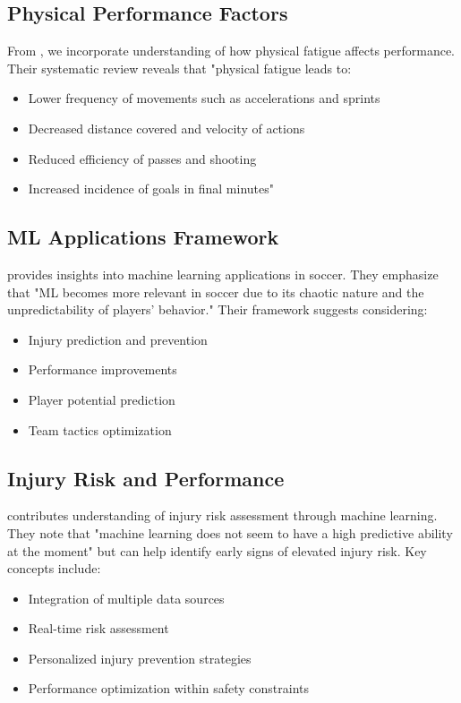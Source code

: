 \documentclass[10pt,journal,compsoc]{IEEEtran}
\begin{document}
\subsection{Physical Performance Factors}
From \cite{dambroz2022effect}, we incorporate understanding of how physical fatigue affects performance. Their systematic review reveals that "physical fatigue leads to:
\begin{itemize}
    \item Lower frequency of movements such as accelerations and sprints
    \item Decreased distance covered and velocity of actions
    \item Reduced efficiency of passes and shooting
    \item Increased incidence of goals in final minutes"
\end{itemize}

\subsection{ML Applications Framework}
\cite{rico2023machine} provides insights into machine learning applications in soccer. They emphasize that "ML becomes more relevant in soccer due to its chaotic nature and the unpredictability of players' behavior." Their framework suggests considering:
\begin{itemize}
    \item Injury prediction and prevention
    \item Performance improvements
    \item Player potential prediction
    \item Team tactics optimization
\end{itemize}

\subsection{Injury Risk and Performance}
\cite{nassis2023review} contributes understanding of injury risk assessment through machine learning. They note that "machine learning does not seem to have a high predictive ability at the moment" but can help identify early signs of elevated injury risk. Key concepts include:
\begin{itemize}
    \item Integration of multiple data sources
    \item Real-time risk assessment
    \item Personalized injury prevention strategies
    \item Performance optimization within safety constraints
\end{itemize}
\end{document}

